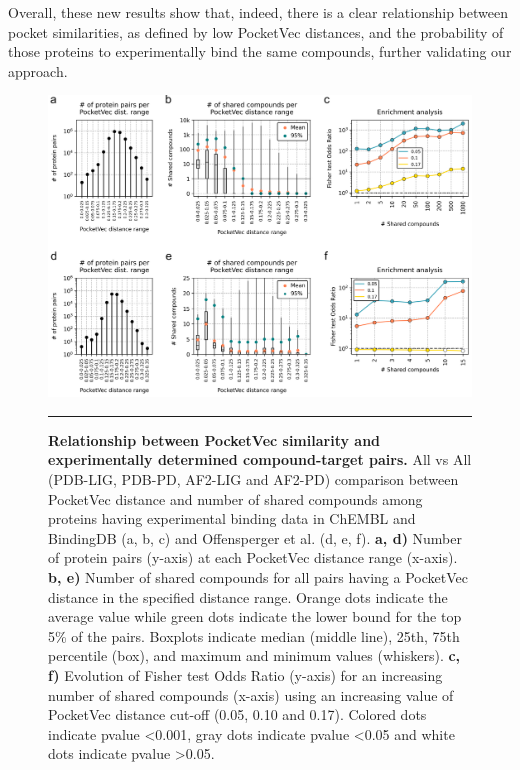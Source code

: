 Overall, these new results show that, indeed, there is a clear relationship between pocket similarities, as defined by low PocketVec distances, and the probability of those proteins to experimentally bind the same compounds, further validating our approach.



\begin{figure}[t!]
  \centering
  \includegraphics[width=\linewidth]{figures/PocketVec/Main/Fig6.png} 
  \caption{
    \textbf{Relationship between PocketVec similarity and experimentally determined compound-target pairs.}
    All vs All (PDB-LIG, PDB-PD, AF2-LIG and AF2-PD) comparison between PocketVec distance and number of shared compounds among proteins having experimental binding data in ChEMBL and BindingDB (a, b, c) and Offensperger et al.\cite{offensperger_large-scale_2024} (d, e, f).
    \textbf{a, d)} Number of protein pairs (y-axis) at each PocketVec distance range (x-axis).
    \textbf{b, e)} Number of shared compounds for all pairs having a PocketVec distance in the specified distance range. Orange dots indicate the average value while green dots indicate the lower bound for the top 5\% of the pairs. Boxplots indicate median (middle line), 25th, 75th percentile (box), and maximum and minimum values (whiskers). 
    \textbf{c, f)} Evolution of Fisher test Odds Ratio (y-axis) for an increasing number of shared compounds (x-axis) using an increasing value of PocketVec distance cut-off (0.05, 0.10 and 0.17). Colored dots indicate pvalue <0.001, gray dots indicate pvalue <0.05 and white dots indicate pvalue >0.05.
  }
  \rule[0ex]{\textwidth}{0.5pt}
  \vspace{-5mm}
  \label{PocketVec_Fig6}
\end{figure}

